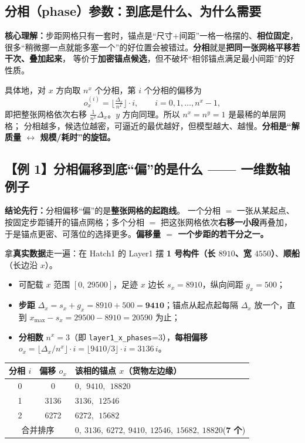 \documentclass[11pt]{ctexart}
\newcommand{\code}[1]{\texttt{#1}}
\begin{document}
\subsection{分相（phase）参数：到底是什么、为什么需要}
\begin{key}\textbf{核心理解：}步距网格只有一套时，锚点是“尺寸+间距”一格一格摆的、\textbf{相位固定}，
很多“稍微挪一点就能多塞一个”的好位置会被错过。\textbf{分相}就是\textbf{把同一张网格平移若干次、叠加起来}，
等价于\textbf{加密锚点候选}，但不破坏“相邻锚点满足最小间距”的好性质。
\end{key}
具体地，对 $x$ 方向取 $n^x$ 个分相，第 $i$ 个分相的偏移为
\[
o_x^{(i)} = \Big\lfloor \tfrac{\Delta_x}{n^x} \Big\rfloor \cdot i,\qquad i=0,1,\dots,n^x-1,
\]
即把整张网格依次右移 $\tfrac{1}{n^x}\Delta_x$。$y$ 方向同理。所以 $n^x=n^y=1$ 是最稀的单层网格；
分相越多，候选位越密，可逼近的最优越好，但模型越大、越慢。\textbf{分相是“解质量 $\leftrightarrow$ 规模/耗时”的旋钮。}

\subsection{【例 1】分相偏移到底“偏”的是什么 —— 一维数轴例子}
\begin{key}\textbf{结论先行：}分相偏移“偏”的是\textbf{整张网格的起跑线}。
一个分相 $=$ 一张从某起点、按固定步距铺开的锚点网格；多个分相 $=$ 把这张网格依次\textbf{右移一小段}再叠加，
于是锚点更密、可落位的选择更多。\textbf{偏移量 $=$ 一个步距的若干分之一。}
\end{key}

拿\textbf{真实数据}走一遍：在 Hatch1 的 Layer1 摆 \textbf{1 号构件（长 $8910$、宽 $4550$）}、\textbf{顺船}（长边沿 $x$）。
\begin{itemize}[leftmargin=1.8em,itemsep=1pt]
  \item 可配载 $x$ 范围 $[0,\,29500]$，足迹 $x$ 边长 $s_x=8910$，纵向间距 $g_x=500$；
  \item \textbf{步距} $\Delta_x=s_x+g_x=8910+500=\mathbf{9410}$；锚点从起点起每隔 $\Delta_x$ 放一个，直到 $x_{\max}-s_x=29500-8910=20590$ 为止；
  \item \textbf{分相数} $n^x=3$（即 \code{layer1\_x\_phases}=3），\textbf{每相偏移} $o_x=\lfloor\Delta_x/n^x\rfloor\cdot i=\lfloor9410/3\rfloor\cdot i=3136\,i$。
\end{itemize}

\begin{center}\small
\begin{tabular}{ccl}
\toprule
分相 $i$ & 偏移 $o_x$ & 该相的锚点 $x$（货物左边缘） \\
\midrule
0 & 0    & $0,\ \ 9410,\ \ 18820$ \\
1 & 3136 & $3136,\ \ 12546$ \\
2 & 6272 & $6272,\ \ 15682$ \\
\midrule
\multicolumn{2}{c}{合并排序} & $0,\ 3136,\ 6272,\ 9410,\ 12546,\ 15682,\ 18820$\quad(\textbf{7 个})\\
\bottomrule
\end{tabular}
\end{center}
\end{document}
